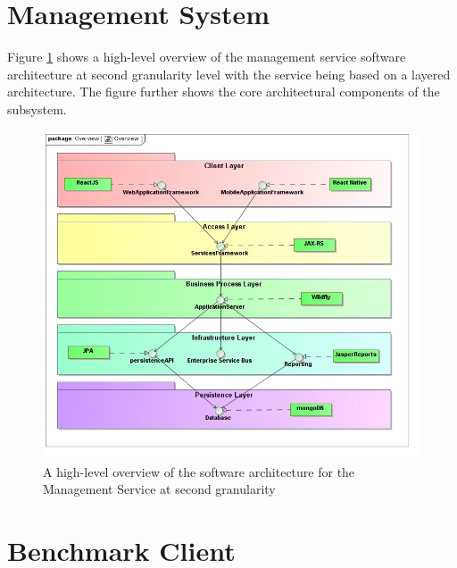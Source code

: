 \section{Management System}
Figure \ref{fig:managementSoftwareArchitecture} shows a high-level overview of
the management service software architecture at second granularity level with the
service being based on a layered architecture. The figure further shows the core
architectural components of the subsystem.
\begin{figure}[H]
  \begin{center}
  \includegraphics[scale=0.4]{../Diagrams and Charts/Overview/Overview.jpg}
  \caption{A high-level overview of the software architecture for the Management Service at second granularity}
  \label{fig:managementSoftwareArchitecture}
  \end{center}
\end{figure}

\section{Benchmark Client}
